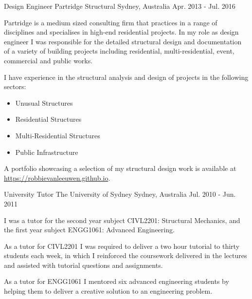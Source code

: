 

\begin{cventries}

  \cventry
    {Design Engineer} %
    {Partridge Structural} %
    {Sydney, Australia} %
    {Apr. 2013 - Jul. 2016} %
    {
      \begin{cvitems} %
        \item {Partridge is a medium sized consulting firm that practices in a range of disciplines and specialises in high-end residential projects. In my role as design engineer I was responsible for the detailed structural design and documentation of a variety of building projects including residential, multi-residential, event, commercial and public works.}
        \item {I have experience in the structural analysis and design of projects in the following sectors:}
        \begin{itemize}
          \item Unusual Structures
          \item Residential Structures
          \item Multi-Residential Structures
          \item Public Infrastructure
        \end{itemize}
        \item A portfolio showcasing a selection of my structural design work is available at \href{https://robbievanleeuwen.github.io}{https://robbievanleeuwen.github.io}.
      \end{cvitems}
    }

  \cventry
    {University Tutor} %
    {The University of Sydney} %
    {Sydney, Australia} %
    {Jul. 2010 - Jun. 2011} %
    {
      \begin{cvitems} %
        \item {I was a tutor for the second year subject CIVL2201: Structural Mechanics, and the first year subject ENGG1061: Advanced Engineering.}
        \item {As a tutor for CIVL2201 I was required to deliver a two hour tutorial to thirty students each week, in which I reinforced the coursework delivered in the lectures and assisted with tutorial questions and assignments.} 
        \item {As a tutor for ENGG1061 I mentored six advanced engineering students by helping them to deliver a creative solution to an engineering problem.}
      \end{cvitems}
    }


\end{cventries}
